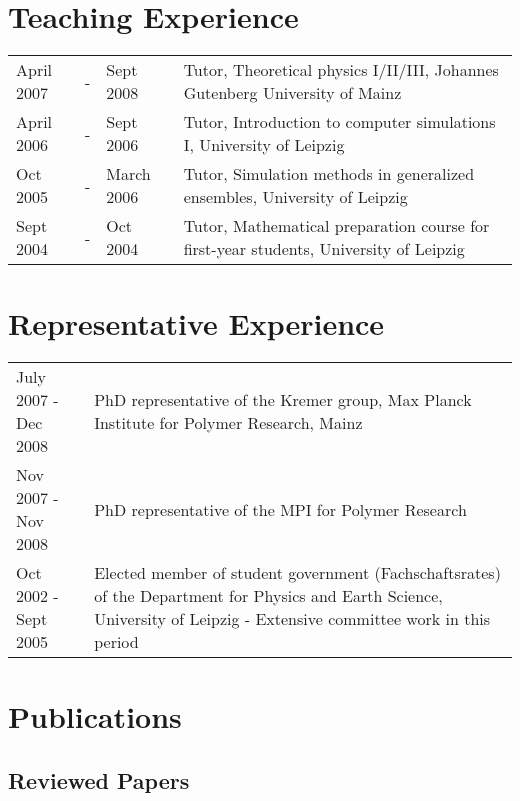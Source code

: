 \documentclass{article}
\begin{document}
\section*{Teaching Experience}

\begin{tabular}{lcll}
April 2007 &-& Sept 2008 & Tutor, Theoretical physics I/II/III, Johannes Gutenberg University of Mainz \\
April 2006 &-& Sept 2006 & Tutor, Introduction to computer simulations I, University of Leipzig \\
Oct 2005 &-& March 2006 & Tutor, Simulation methods in generalized ensembles, University of Leipzig \\
Sept 2004 &-& Oct 2004 & Tutor, Mathematical preparation course for first-year students, University of Leipzig \\
\end{tabular}

\section*{Representative Experience}

\begin{tabular}{p{}p{}}
July 2007 - Dec 2008 & PhD representative of the Kremer group, Max Planck Institute for Polymer Research, Mainz \\
Nov 2007 - Nov 2008 & PhD representative of the MPI for Polymer Research \\
Oct 2002 - Sept 2005 & Elected member of student government (Fachschaftsrates) of the Department for Physics and Earth Science, University of Leipzig - Extensive committee work in this period\\
\end{tabular}

\section*{Publications}

\subsection*{Reviewed Papers}
\end{document}
